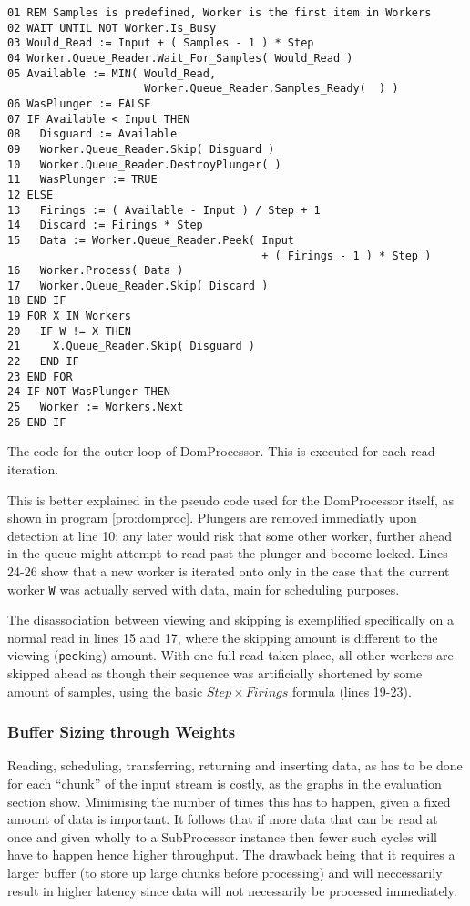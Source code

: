 \begin{program}
\begin{verbatim}
01 REM Samples is predefined, Worker is the first item in Workers
02 WAIT UNTIL NOT Worker.Is_Busy
03 Would_Read := Input + ( Samples - 1 ) * Step
04 Worker.Queue_Reader.Wait_For_Samples( Would_Read )
05 Available := MIN( Would_Read,
                     Worker.Queue_Reader.Samples_Ready(  ) )
06 WasPlunger := FALSE
07 IF Available < Input THEN
08   Disguard := Available
09   Worker.Queue_Reader.Skip( Disguard )
10   Worker.Queue_Reader.DestroyPlunger( )
11   WasPlunger := TRUE
12 ELSE
13   Firings := ( Available - Input ) / Step + 1
14   Discard := Firings * Step
15   Data := Worker.Queue_Reader.Peek( Input
                                       + ( Firings - 1 ) * Step )
16   Worker.Process( Data )
17   Worker.Queue_Reader.Skip( Discard )
18 END IF
19 FOR X IN Workers
20   IF W != X THEN
21     X.Queue_Reader.Skip( Disguard )
22   END IF
23 END FOR
24 IF NOT WasPlunger THEN
25   Worker := Workers.Next
26 END IF
\end{verbatim}
\caption{The code for the outer loop of DomProcessor. This is executed for each read iteration.}
\label{pro:domproc}
\end{program}

This is better explained in the pseudo code used for the DomProcessor itself, as shown in program \ref{pro:domproc}. Plungers are removed immediatly upon detection at line 10; any later would risk that some other worker, further ahead in the queue might attempt to read past the plunger and become locked. Lines 24-26 show that a new worker is iterated onto only in the case that the current worker \verb|W| was actually served with data, main for scheduling purposes.

The disassociation between viewing and skipping is exemplified specifically on a normal read in lines 15 and 17, where the skipping amount is different to the viewing (\verb|peek|ing) amount. With one full read taken place, all other workers are skipped ahead as though their sequence was artificially shortened by some amount of samples, using the basic $Step \times Firings$ formula (lines 19-23).

\subsubsection{Buffer Sizing through Weights}\label{sec:buffersizing}

Reading, scheduling, transferring, returning and inserting data, as has to be done for each ``chunk'' of the input stream is costly, as the graphs in the evaluation section show. Minimising the number of times this has to happen, given a fixed amount of data is important. It follows that if more data that can be read at once and given wholly to a SubProcessor instance then fewer such cycles will have to happen hence higher throughput. The drawback being that it requires a larger buffer (to store up large chunks before processing) and will neccessarily result in higher latency since data will not necessarily be processed immediately.

